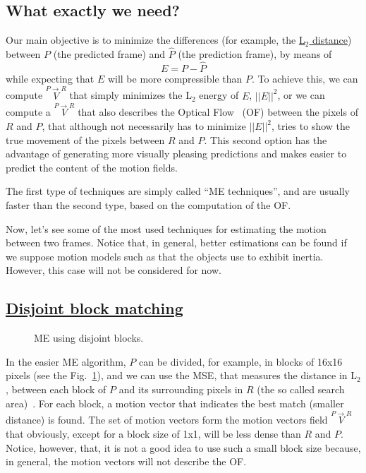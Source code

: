 \subsection{What exactly we need?}
Our main objective is to minimize the differences (for example, the
\href{https://en.wikipedia.org/wiki/Euclidean_distance}{L$_2$
  distance}) between $P$ (the predicted frame) and $\hat{P}$ (the
prediction frame), by means of
\begin{equation}
  E = P - \hat{P}
\end{equation}
while expecting that $E$ will be more compressible than $P$. To
achieve this, we can compute $\overset{P\rightarrow R}{V}$ that simply
minimizes the L$_2$ energy of $E$, $||E||^2$, or we can compute a
$\overset{P\rightarrow R}{V}$ that also describes the Optical
Flow~\cite{horn1981determining} (OF) between the pixels of $R$ and
$P$, that although not necessarily has to minimize $||E||^2$, tries to
show the true movement of the pixels between $R$ and $P$. This second
option has the advantage of generating more visually pleasing
predictions and makes easier to predict the content of the motion
fields.

The first type of techniques are simply called ``ME techniques'', and
are usually faster than the second type, based on the computation of
the OF.


Now, let's see some of the most used techniques for estimating the
motion between two frames. Notice that, in general, better estimations
can be found if we suppose motion models such as that the objects use
to exhibit inertia. However, this case will not be considered for now.

\subsection{\href{https://vicente-gonzalez-ruiz.github.io/video_compression/\#x1-40003}{Disjoint block matching}}

\begin{figure}
  \centering
  \caption{ME using disjoint blocks.}
  \label{fig:simple}
\end{figure}

In the easier ME algorithm, $P$ can be divided, for example, in blocks
of 16x16 pixels (see the Fig.~\ref{fig:simple}), and we can use the
MSE, that measures the distance in L$_2$, between each block of $P$
and its surrounding pixels in $R$ (the so called search
area)~\cite{zhu2000new}. For each block, a motion vector that
indicates the best match (smaller distance) is found. The set of
motion vectors form the motion vectors field
$\overset{P\rightarrow R}{V}$ that obviously, except for a block size
of 1x1, will be less dense than $R$ and $P$. Notice, however, that, it
is not a good idea to use such a small block size because, in general,
the motion vectors will not describe the OF.


